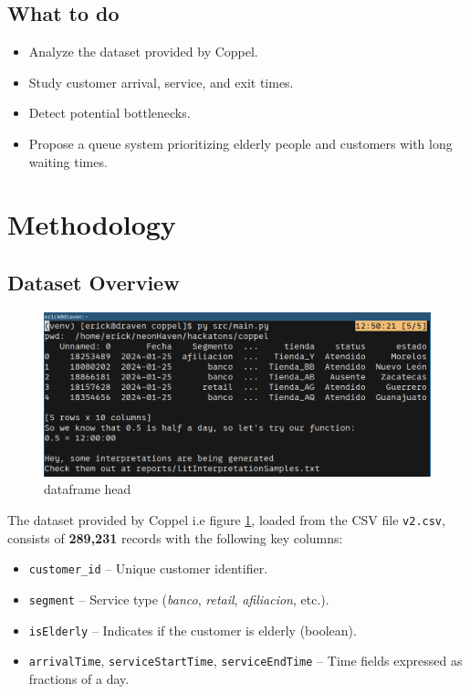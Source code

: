 \documentclass[twoside]{article}
\begin{document}
\subsection*{What to do}
\begin{itemize}
  \item Analyze the dataset provided by Coppel.
  \item Study customer arrival, service, and exit times.
  \item Detect potential bottlenecks.
  \item Propose a queue system prioritizing elderly people and customers with long waiting times.
\end{itemize}

\section{Methodology}
\subsection*{Dataset Overview}

\begin{figure}[H]
  \centering
  \includegraphics[width=1\textwidth]{imgs/df.png}
  \caption{dataframe head}
  \label{fig:1}
\end{figure}

The dataset provided by Coppel i.e figure \ref{fig:1}, loaded from the CSV file \texttt{v2.csv}, consists of \textbf{289,231} records with the following key columns:

\begin{itemize}
    \item \texttt{customer\_id} -- Unique customer identifier.
    \item \texttt{segment} -- Service type (\textit{banco}, \textit{retail}, \textit{afiliacion}, etc.).
    \item \texttt{isElderly} -- Indicates if the customer is elderly (boolean).
    \item \texttt{arrivalTime}, \texttt{serviceStartTime}, \texttt{serviceEndTime} -- Time fields expressed as fractions of a day.
\end{itemize}
\end{document}
